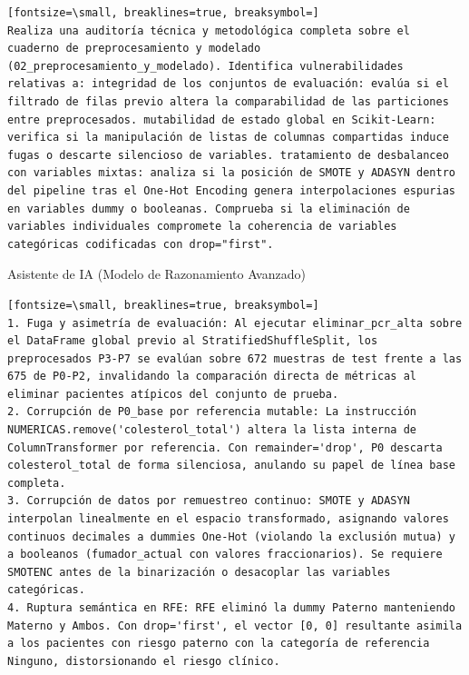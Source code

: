\documentclass[12pt,a4paper,oneside]{book}
\begin{document}
\begin{iaprompt}
\begin{Verbatim}[fontsize=\small, breaklines=true, breaksymbol=]
Realiza una auditoría técnica y metodológica completa sobre el cuaderno de preprocesamiento y modelado (02_preprocesamiento_y_modelado). Identifica vulnerabilidades relativas a: integridad de los conjuntos de evaluación: evalúa si el filtrado de filas previo altera la comparabilidad de las particiones entre preprocesados. mutabilidad de estado global en Scikit-Learn: verifica si la manipulación de listas de columnas compartidas induce fugas o descarte silencioso de variables. tratamiento de desbalanceo con variables mixtas: analiza si la posición de SMOTE y ADASYN dentro del pipeline tras el One-Hot Encoding genera interpolaciones espurias en variables dummy o booleanas. Comprueba si la eliminación de variables individuales compromete la coherencia de variables categóricas codificadas con drop="first".
\end{Verbatim}
\end{iaprompt}
\begin{iaresp}{Asistente de IA (Modelo de Razonamiento Avanzado)}
\begin{Verbatim}[fontsize=\small, breaklines=true, breaksymbol=]
1. Fuga y asimetría de evaluación: Al ejecutar eliminar_pcr_alta sobre el DataFrame global previo al StratifiedShuffleSplit, los preprocesados P3-P7 se evalúan sobre 672 muestras de test frente a las 675 de P0-P2, invalidando la comparación directa de métricas al eliminar pacientes atípicos del conjunto de prueba.
2. Corrupción de P0_base por referencia mutable: La instrucción NUMERICAS.remove('colesterol_total') altera la lista interna de ColumnTransformer por referencia. Con remainder='drop', P0 descarta colesterol_total de forma silenciosa, anulando su papel de línea base completa.
3. Corrupción de datos por remuestreo continuo: SMOTE y ADASYN interpolan linealmente en el espacio transformado, asignando valores continuos decimales a dummies One-Hot (violando la exclusión mutua) y a booleanos (fumador_actual con valores fraccionarios). Se requiere SMOTENC antes de la binarización o desacoplar las variables categóricas.
4. Ruptura semántica en RFE: RFE eliminó la dummy Paterno manteniendo Materno y Ambos. Con drop='first', el vector [0, 0] resultante asimila a los pacientes con riesgo paterno con la categoría de referencia Ninguno, distorsionando el riesgo clínico.
\end{Verbatim}
\end{iaresp}
\end{document}
